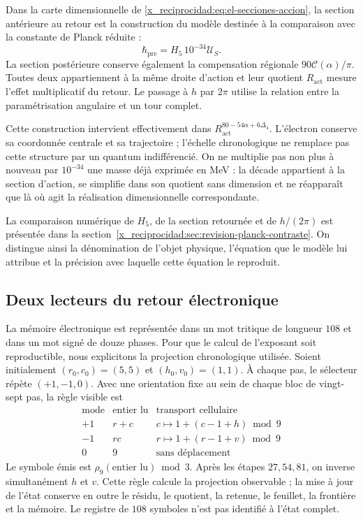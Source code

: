 Dans la carte dimensionnelle de \eqref{x_reciprocidad:eq:el-secciones-accion}, la section
antérieure au retour est la construction du modèle destinée à la comparaison
avec la constante de Planck réduite :
\[
 \hbar_{\mathrm{pre}}=H_5\,10^{-34}\mathcal U_S.
\]
La section postérieure conserve également la compensation régionale
\(90\mathscr C(\alpha)/\pi\). Toutes deux appartiennent à la même droite
d'action et leur quotient \(R_{\mathrm{act}}\) mesure l'effet multiplicatif
du retour. Le passage à \(h\) par \(2\pi\) utilise la relation
entre la paramétrisation angulaire et un tour complet.

Cette construction intervient effectivement dans
\(R_{\mathrm{act}}^{80-54\alpha+6\Delta_4}\). L'électron conserve
sa coordonnée centrale et sa trajectoire ; l'échelle chronologique ne
remplace pas cette structure par un quantum indifférencié. On ne
multiplie pas non plus à nouveau par \(10^{-34}\) une masse déjà exprimée en MeV :
la décade appartient à la section d'action, se simplifie dans son quotient
sans dimension et ne réapparaît que là où agit la réalisation
dimensionnelle correspondante.

La comparaison numérique de \(H_5\), de la section retournée et de
\(h/(2\pi)\) est présentée dans la section~\ref{x_reciprocidad:sec:revision-planck-contraste}.
On distingue ainsi la dénomination de l'objet physique, l'équation que le
modèle lui attribue et la précision avec laquelle cette équation le reproduit.



\subsection{Deux lecteurs du retour électronique}

La mémoire électronique est représentée dans un mot tritique de longueur \(108\) et dans un mot signé de douze phases. Pour que le calcul de l'exposant soit reproductible, nous explicitons la projection chronologique utilisée. Soient initialement \((r_0,c_0)=(5,5)\) et \((h_0,v_0)=(1,1)\). À chaque pas, le sélecteur répète \((+1,-1,0)\). Avec une orientation fixe au sein de chaque bloc de vingt-sept pas, la règle visible est
\[
 \begin{array}{c|c|c}
 \text{mode}&\text{entier lu}&\text{transport cellulaire}\\\hline
 +1&r+c&c\mapsto1+(c-1+h)\bmod9\\
 -1&rc&r\mapsto1+(r-1+v)\bmod9\\
 0&9&\text{sans déplacement}
 \end{array}
\]
Le symbole émis est \(\rho_9(\text{entier lu})\bmod3\).
Après les étapes \(27,54,81\), on inverse simultanément
\(h\) et \(v\). Cette règle calcule la projection observable ; la
mise à jour de l'état conserve en outre le résidu, le quotient,
la retenue, le feuillet, la frontière et la mémoire. Le registre de
\(108\) symboles n'est pas identifié à l'état complet.

